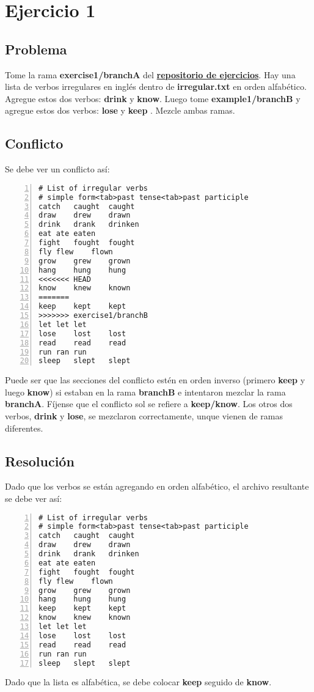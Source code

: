
\section{Ejercicio 1}
\label{exercise_01}
\subsection*{Problema}
Tome la rama {\bf exercise1/branchA } del \hyperref[exercises_repo]{\bf repositorio de ejercicios}. Hay una lista
de verbos irregulares en inglés dentro de {\bf irregular.txt} en orden alfabético. Agregue estos dos verbos: {\bf drink} y {\bf know}.
Luego tome {\bf example1/branchB } y agregue estos dos verbos: {\bf lose } y {\bf keep }. Mezcle ambas ramas.

\subsection*{Conflicto}
Se debe ver un conflicto así:
\begin{lstlisting}[style=console_style, numbers=left, caption={\bf Ejercicio 1} - conflicto]
# List of irregular verbs
# simple form<tab>past tense<tab>past participle
catch	caught	caught
draw	drew	drawn
drink	drank	drinken
eat	ate	eaten
fight	fought	fought
fly	flew	flown
grow	grew	grown
hang	hung	hung
<<<<<<< HEAD
know	knew	known
=======
keep	kept	kept
>>>>>>> exercise1/branchB
let	let	let
lose	lost	lost
read	read	read
run	ran	run
sleep	slept	slept
\end{lstlisting}

Puede ser que las secciones del conflicto estén en orden inverso (primero {\bf keep} y luego {\bf know}) si estaban en la rama
{\bf branchB} e intentaron mezclar la rama {\bf branchA}. Fíjense que el conflicto sol se refiere a {\bf keep/know}. Los otros dos verbos,
{\bf drink} y {\bf lose}, se mezclaron correctamente, unque vienen de ramas diferentes.

\subsection*{Resolución}
Dado que los verbos se están agregando en orden alfabético, el archivo resultante se debe ver así:
\begin{lstlisting}[style=console_style, numbers=left, caption={\bf Ejercicio 1} - Resolución]
# List of irregular verbs
# simple form<tab>past tense<tab>past participle
catch	caught	caught
draw	drew	drawn
drink	drank	drinken
eat	ate	eaten
fight	fought	fought
fly	flew	flown
grow	grew	grown
hang	hung	hung
keep	kept	kept
know	knew	known
let	let	let
lose	lost	lost
read	read	read
run	ran	run
sleep	slept	slept
\end{lstlisting}
Dado que la lista es alfabética, se debe colocar {\bf keep} seguido de {\bf know}.


